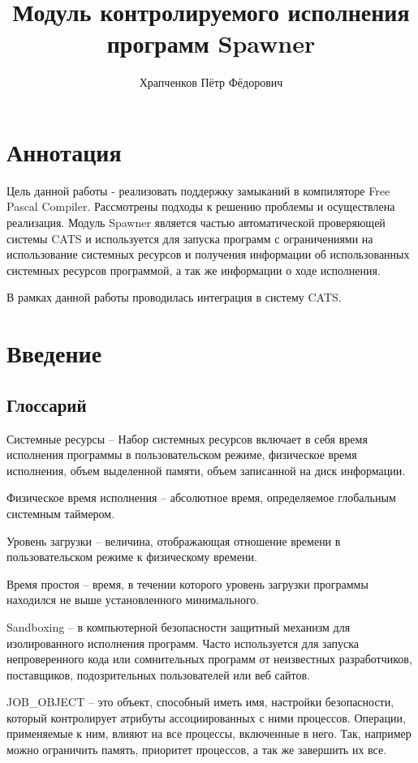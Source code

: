 \documentclass{imcs}
\title{Модуль контролируемого исполнения программ Spawner}
\author{Храпченков Пётр Фёдорович}
\begin{document}
\maketitle

\tableofcontents
\pagebreak

\section*{Аннотация}
Цель данной работы - реализовать поддержку замыканий в компиляторе Free Pascal Compiler.
Рассмотрены подходы к решению проблемы и осуществлена реализация.
Модуль Spawner является частью автоматической проверяющей системы CATS и используется для запуска программ с ограничениями на использование системных ресурсов и получения информации об использованных системных ресурсов программой, а так же информации о ходе исполнения.

В рамках данной работы проводилась интеграция в систему CATS.

\pagebreak

\section{Введение}
\subsection{Глоссарий}

Системные ресурсы -- Набор системных ресурсов включает в себя время исполнения программы в пользовательском режиме, физическое время исполнения, объем выделенной памяти, объем записанной на диск информации.

Физическое время исполнения -- абсолютное время, определяемое глобальным системным таймером.

Уровень загрузки -- величина, отображающая отношение времени в пользовательском режиме к физическому времени.

Время простоя -- время, в течении которого уровень загрузки программы находился не выше установленного минимального.

Sandboxing -- в компьютерной безопасности защитный механизм для изолированного исполнения программ. Часто используется для запуска непроверенного кода или сомнительных программ от неизвестных разработчиков, поставщиков, подозрительных пользователей или веб сайтов.

JOB\_OBJECT -- это объект, способный иметь имя, настройки безопасности, который контролирует атрибуты ассоциированных с ними процессов. Операции, применяемые к ним, влияют на все процессы, включенные в него. Так, например можно ограничить память, приоритет процессов, а так же завершить их все.
\end{document}

